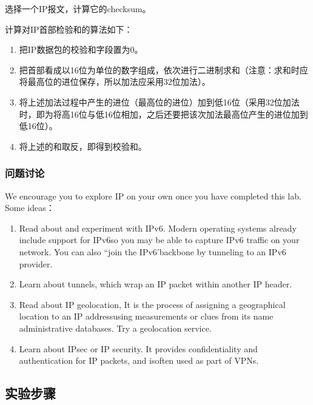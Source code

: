 \documentclass{article}
\begin{document}
选择一个IP报文，计算它的checksum。

计算对IP首部检验和的算法如下：
\begin{enumerate}[noitemsep, label={({\arabic*})}]
  \item 把IP数据包的校验和字段置为0。
  \item 把首部看成以16位为单位的数字组成，依次进行二进制求和（注意：求和时应将最高位的进位保存，所以加法应采用32位加法）。
  \item 将上述加法过程中产生的进位（最高位的进位）加到低16位（采用32位加法时，即为将高16位与低16位相加，之后还要把该次加法最高位产生的进位加到低16位）。
  \item 将上述的和取反，即得到校验和。
\end{enumerate}


\subsubsection{问题讨论}

We encourage you to explore IP on your own once you have completed this lab. Some ideas：

\begin{enumerate}[noitemsep]
  \item Read about and experiment with IPv6. Modern operating systems already include support for IPv6so you may be able to capture IPv6 traffic on your network. You can also “join the IPv6'backbone by tunneling to an IPv6 provider.
  \item Learn about tunnels, which wrap an IP packet within another IP header.
  \item Read about IP geolocation, It is the process of assigning a geographical location to an IP addressusing measurements or clues from its name administrative databases. Try a geolocation service.
  \item Learn about IPsec or IP security. It provides confidentiality and authentication for IP packets, and isoften used as part of VPNs.
\end{enumerate}


\subsection{实验步骤}
\end{document}
